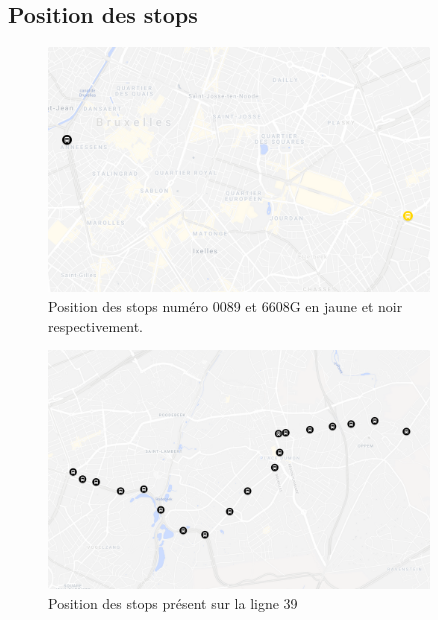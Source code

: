 \documentclass[12pt]{report}
\begin{document}
\begin{appendices}
    \chapter{Position des stops}
    \begin{figure}
        \centering
        \includegraphics[width=0.9\textwidth]{images/stop_pos_1.png}
        \caption{Position des stops numéro 0089 et 6608G en jaune et noir respectivement.}
        \label{appendix:stop_pos_1}
    \end{figure}

    \begin{figure}
        \centering
        \includegraphics[width=0.9\textwidth]{images/stop_pos_2.png}
        \caption{Position des stops présent sur la ligne 39}
        \label{appendix:stop_pos_2}
    \end{figure}

\end{appendices}

\nocite{*}
\printbibliography
\end{document}
